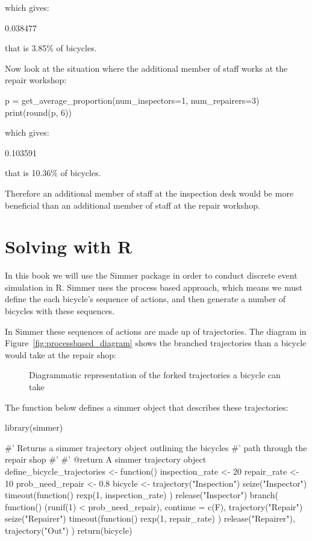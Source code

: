 which gives:

\begin{pyout}
0.038477
\end{pyout}

that is 3.85\% of bicycles.

Now look at the situation where the additional member of staff works at the
repair workshop:

\begin{pyin}
p = get_average_proportion(num_inspectors=1, num_repairers=3)
print(round(p, 6))
\end{pyin}

which gives:

\begin{pyout}
0.103591
\end{pyout}

that is 10.36\% of bicycles.

Therefore an additional member of staff at the inspection desk would be more
beneficial than an additional member of staff at the repair workshop.


\section{Solving with R}\label{sec:solving-with-R}

In this book we will use the Simmer package in order to conduct discrete event
simulation in R.
Simmer uses the process based approach, which means we must define the each
bicycle's sequence of actions, and then generate a number of bicycles with these
sequences.

In Simmer these sequences of actions are made up of trajectories. The
diagram in Figure~\ref{fig:processbased_diagram} shows the branched
trajectories than a bicycle would take at the repair shop:

\begin{figure}
\begin{center}

\caption{Diagrammatic representation of the forked trajectories a bicycle can take}
\label{fog:processbased_diagram}
\end{center}
\end{figure}

The function below defines a simmer object that describes these trajectories:

\begin{Rin}
library(simmer)

#' Returns a simmer trajectory object outlining the bicycles
#' path through the repair shop
#'
#' @return A simmer trajectory object
define_bicycle_trajectories <- function() {
  inspection_rate <- 20
  repair_rate <- 10
  prob_need_repair <- 0.8
  bicycle <-
    trajectory("Inspection") %
    seize("Inspector") %
    timeout(function() {
      rexp(1, inspection_rate)
    }) %
    release("Inspector") %
    branch(
      function() (runif(1) < prob_need_repair),
      continue = c(F),
      trajectory("Repair") %
        seize("Repairer") %
        timeout(function() {
          rexp(1, repair_rate)
        }) %
        release("Repairer"),
      trajectory("Out")
    )
  return(bicycle)
}
\end{Rin}

